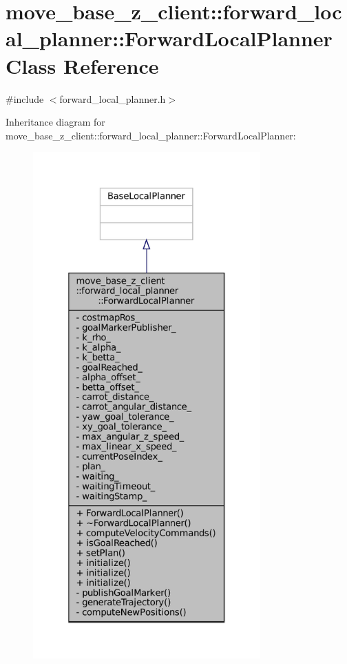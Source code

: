 \hypertarget{classmove__base__z__client_1_1forward__local__planner_1_1ForwardLocalPlanner}{}\section{move\+\_\+base\+\_\+z\+\_\+client\+:\+:forward\+\_\+local\+\_\+planner\+:\+:Forward\+Local\+Planner Class Reference}
\label{classmove__base__z__client_1_1forward__local__planner_1_1ForwardLocalPlanner}


{\ttfamily \#include $<$forward\+\_\+local\+\_\+planner.\+h$>$}



Inheritance diagram for move\+\_\+base\+\_\+z\+\_\+client\+:\+:forward\+\_\+local\+\_\+planner\+:\+:Forward\+Local\+Planner\+:
\nopagebreak
\begin{figure}[H]
\begin{center}
\leavevmode
\includegraphics[height=550pt]{classmove__base__z__client_1_1forward__local__planner_1_1ForwardLocalPlanner__inherit__graph}
\end{center}
\end{figure}


